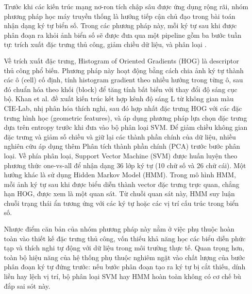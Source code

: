 \documentclass[../DoAn.tex]{subfiles}
\begin{document}
Trước khi các kiến trúc mạng nơ-ron tích chập sâu được ứng dụng rộng rãi, nhóm phương pháp học máy truyền thống là hướng tiếp cận chủ đạo trong bài toán nhận dạng ký tự biển số. Trong các phương pháp này, mỗi ký tự sau khi được phân đoạn ra khỏi ảnh biển số sẽ được đưa qua một pipeline gồm ba bước tuần tự: trích xuất đặc trưng thủ công, giảm chiều dữ liệu, và phân loại \cite{liu2012research}.

Về trích xuất đặc trưng, Histogram of Oriented Gradients (HOG) là descriptor thủ công phổ biến. Phương pháp này hoạt động bằng cách chia ảnh ký tự thành các ô (cell) cố định, tính histogram gradient theo nhiều hướng trong từng ô, sau đó chuẩn hóa theo khối (block) để tăng tính bất biến với thay đổi độ sáng cục bộ. Khan et al. đề xuất kiến trúc kết hợp kênh độ sáng L từ không gian màu CIE-Lab, nhị phân hóa thích nghi, sau đó hợp nhất đặc trưng HOG với các đặc trưng hình học (geometric features), và áp dụng phương pháp lựa chọn đặc trưng dựa trên entropy trước khi đưa vào bộ phân loại SVM. Để giảm chiều không gian đặc trưng và giảm số chiều và giữ lại các thành phần chính của dữ liệu, nhiều nghiên cứu áp dụng thêm Phân tích thành phần chính (PCA) trước bước phân loại. Về phía phân loại, Support Vector Machine (SVM) được huấn luyện theo phương thức one-vs-all để nhận dạng 36 lớp ký tự (10 chữ số và 26 chữ cái). Một hướng khác là sử dụng Hidden Markov Model (HMM). Trong mô hình HMM, mỗi ảnh ký tự sau khi được biểu diễn thành vector đặc trưng trực quan, chẳng hạn HOG, được xem là một quan sát. Từ chuỗi quan sát này, HMM suy luận chuỗi trạng thái ẩn tương ứng với các ký tự hoặc các vị trí cấu trúc trong biển số.

Nhược điểm căn bản của nhóm phương pháp này nằm ở việc phụ thuộc hoàn toàn vào thiết kế đặc trưng thủ công, vốn thiếu khả năng học các biểu diễn phức tạp và thích nghi tự động với dữ liệu trong môi trường thực tế. Quan trọng hơn, toàn bộ hiệu năng của hệ thống phụ thuộc nghiêm ngặt vào chất lượng của bước phân đoạn ký tự đứng trước: nếu bước phân đoạn tạo ra ký tự bị cắt thiếu, dính liền hay lệch vị trí, bộ phân loại SVM hay HMM hoàn toàn không có cơ chế bù đắp sai sót này.
\end{document}
